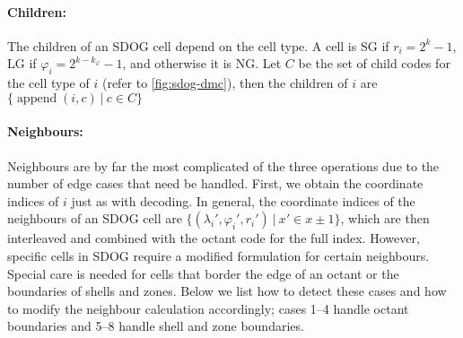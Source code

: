 \paragraph{Children:}
The children of an SDOG cell depend on the cell type.
A cell is SG if $r_i = 2^k - 1$, LG if $\varphi_i = 2^{k - k_\varphi} - 1$, and otherwise it is NG.
Let $C$ be the set of child codes for the cell type of $i$ (refer to \cref{fig:sdog-dmc}), then the children of $i$ are $\{ \operatorname{append}(i, c) \ | \ c \in C \}$


\paragraph{Neighbours:}
Neighbours are by far the most complicated of the three operations due to the number of edge cases that need be handled.
First, we obtain the coordinate indices of $i$ just as with decoding.
In general, the coordinate indices of the neighbours of an SDOG cell are $\{ (\lambda_i', \varphi_i', r_i') \ | \ x' \in x \pm 1 \}$, which are then interleaved and combined with the octant code for the full index.
However, specific cells in SDOG require a modified formulation for certain neighbours.
Special care is needed for cells that border the edge of an octant or the boundaries of shells and zones.
Below we list how to detect these cases and how to modify the neighbour calculation accordingly; cases 1--4 handle octant boundaries and 5--8 handle shell and zone boundaries.
%
